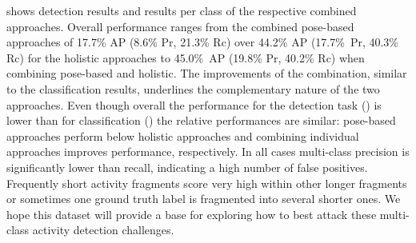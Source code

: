  shows detection results and 
 results per class of the respective combined approaches. 
%
Overall performance ranges from the combined pose-based approaches of 17.7\% AP (8.6\% Pr, 21.3\% Rc) over 44.2\% AP (17.7\%~Pr, 40.3\% Rc) for the holistic approaches to 45.0\%~AP (19.8\% Pr, 40.2\% Rc) when combining pose-based and holistic. The improvements of the combination, similar to the classification results, underlines the complementary nature of the two approaches. Even though overall
the performance for the detection task () is lower than for classification () 
the relative performances are similar: pose-based approaches perform below holistic approaches and combining individual approaches improves performance, respectively. 
In all cases multi-class precision is significantly lower than recall, indicating a high number of false positives. Frequently short activity fragments score very high within other longer fragments or sometimes one ground truth label is fragmented into several shorter ones. We hope this dataset will provide a base for exploring how to best attack these multi-class activity detection challenges. 

